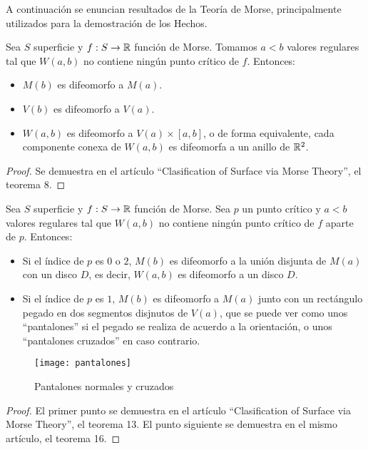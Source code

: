 
A continuación se enuncian resultados de la Teoría de Morse, principalmente utilizados para la demostración de los Hechos.

\begin{teorema}
	Sea $S$ superficie y $f: S \rightarrow \mathbb{R}$ función de Morse. Tomamos $a < b$ valores regulares tal que $W(a,b)$ no contiene ningún punto crítico de $f$. Entonces:
	\begin{itemize}
		\item $M(b)$ es difeomorfo a $M(a)$.
		\item $V(b)$ es difeomorfo a $V(a)$.
		\item $W(a,b)$ es difeomorfo a $V(a) \times [a,b]$, o de forma equivalente, cada componente conexa de $W(a,b)$ es difeomorfa a un anillo de $\mathbb{R}^2$.
	\end{itemize}
\end{teorema}

\begin{proof}
	Se demuestra en el artículo ``Clasification of Surface via Morse Theory'', el teorema 8.
\end{proof}

\begin{teorema}
	Sea $S$ superficie y $f: S \rightarrow \mathbb{R}$ función de Morse. Sea $p$ un punto crítico y $a < b$ valores regulares tal que $W(a,b)$ no contiene ningún punto crítico de $f$ aparte de $p$. Entonces:
	\begin{itemize}
		\item Si el índice de $p$ es $0$ o $2$, $M(b)$ es difeomorfo a la unión disjunta de $M(a)$ con un disco $D$, es decir, $W(a,b)$ es difeomorfo a un disco $D$.
		\item Si el índice de $p$ es $1$, $M(b)$ es difeomorfo a $M(a)$ junto con un rectángulo pegado  en dos segmentos disjnutos de $V(a)$, que se puede ver como unos ``pantalones'' si el pegado se realiza de acuerdo a la orientación, o unos ``pantalones cruzados'' en caso contrario.
	\end{itemize}
\end{teorema}

\begin{figure}[h]
  	\centering
  	\texttt{[image: pantalones]}
  	\caption{Pantalones normales y cruzados}
  	\label{fig:pantalones}
\end{figure}

\begin{proof}
	El primer punto se demuestra en el artículo ``Clasification of Surface via Morse Theory'', el teorema 13. El punto siguiente se demuestra en el mismo artículo, el teorema 16.
\end{proof}

\endinput
